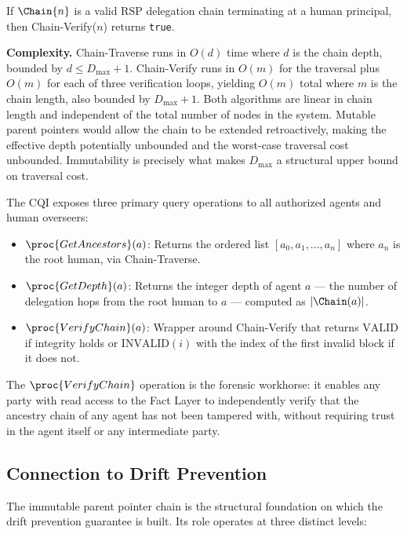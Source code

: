 \begin{prop}
\label{prop:chain_verify_completeness}
If $\Chain{n}$ is a valid RSP delegation chain terminating at a human principal, then Chain-Verify($n$) returns \texttt{true}.
\end{prop}

\textbf{Complexity.} Chain-Traverse runs in $O(d)$ time where $d$ is the chain depth, bounded by $d \leq D_{\max} + 1$. Chain-Verify runs in $O(m)$ for the traversal plus $O(m)$ for each of three verification loops, yielding $O(m)$ total where $m$ is the chain length, also bounded by $D_{\max} + 1$. Both algorithms are linear in chain length and independent of the total number of nodes in the system. Mutable parent pointers would allow the chain to be extended retroactively, making the effective depth potentially unbounded and the worst-case traversal cost unbounded. Immutability is precisely what makes $D_{\max}$ a structural upper bound on traversal cost.

The CQI exposes three primary query operations to all authorized agents and human overseers:
\begin{itemize}
    \item $\proc{GetAncestors}(a)$: Returns the ordered list $[a_0, a_1, \ldots, a_n]$ where $a_n$ is the root human, via Chain-Traverse.
    \item $\proc{GetDepth}(a)$: Returns the integer depth of agent $a$ --- the number of delegation hops from the root human to $a$ --- computed as $|\Chain(a)|$.
    \item $\proc{VerifyChain}(a)$: Wrapper around Chain-Verify that returns $\mathrm{VALID}$ if integrity holds or $\mathrm{INVALID}(i)$ with the index of the first invalid block if it does not.
\end{itemize}

The $\proc{VerifyChain}$ operation is the forensic workhorse: it enables any party with read access to the Fact Layer to independently verify that the ancestry chain of any agent has not been tampered with, without requiring trust in the agent itself or any intermediate party.

\subsection{Connection to Drift Prevention}
\label{sec:drift_prevention_link}

The immutable parent pointer chain is the structural foundation on which the drift prevention guarantee is built. Its role operates at three distinct levels:

